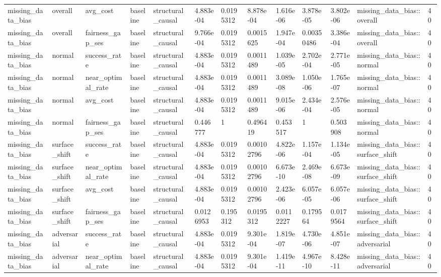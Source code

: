 \begin{tabular}{lllllllllllll}
missing\_data\_bias & overall & avg\_cost & baseline & structural\_causal & 4.883e-04 & 0.0195312 & 8.878e-04 & 1.616e-06 & 3.878e-05 & 3.802e-06 & missing\_data\_bias::overall & 40 \\
missing\_data\_bias & overall & fairness\_gap\_ses & baseline & structural\_causal & 9.766e-04 & 0.0195312 & 0.0015625 & 1.947e-04 & 0.00350486 & 3.386e-04 & missing\_data\_bias::overall & 40 \\
missing\_data\_bias & normal & success\_rate & baseline & structural\_causal & 4.883e-04 & 0.0195312 & 0.0011489 & 1.039e-05 & 2.702e-04 & 2.771e-05 & missing\_data\_bias::normal & 40 \\
missing\_data\_bias & normal & near\_optimal\_rate & baseline & structural\_causal & 4.883e-04 & 0.0195312 & 0.0011489 & 3.089e-08 & 1.050e-06 & 1.765e-07 & missing\_data\_bias::normal & 40 \\
missing\_data\_bias & normal & avg\_cost & baseline & structural\_causal & 4.883e-04 & 0.0195312 & 0.0011489 & 9.015e-06 & 2.434e-04 & 2.576e-05 & missing\_data\_bias::normal & 40 \\
missing\_data\_bias & normal & fairness\_gap\_ses & baseline & structural\_causal & 0.446777 & 1 & 0.496419 & 0.453517 & 1 & 0.503908 & missing\_data\_bias::normal & 40 \\
missing\_data\_bias & surface\_shift & success\_rate & baseline & structural\_causal & 4.883e-04 & 0.0195312 & 0.00102796 & 4.822e-06 & 1.157e-04 & 1.134e-05 & missing\_data\_bias::surface\_shift & 40 \\
missing\_data\_bias & surface\_shift & near\_optimal\_rate & baseline & structural\_causal & 4.883e-04 & 0.0195312 & 0.00102796 & 6.673e-10 & 2.469e-08 & 6.673e-09 & missing\_data\_bias::surface\_shift & 40 \\
missing\_data\_bias & surface\_shift & avg\_cost & baseline & structural\_causal & 4.883e-04 & 0.0195312 & 0.00102796 & 2.423e-06 & 6.057e-05 & 6.057e-06 & missing\_data\_bias::surface\_shift & 40 \\
missing\_data\_bias & surface\_shift & fairness\_gap\_ses & baseline & structural\_causal & 0.0126953 & 0.195312 & 0.0195312 & 0.0112227 & 0.179564 & 0.0179564 & missing\_data\_bias::surface\_shift & 40 \\
missing\_data\_bias & adversarial & success\_rate & baseline & structural\_causal & 4.883e-04 & 0.0195312 & 9.301e-04 & 1.819e-07 & 4.730e-06 & 4.851e-07 & missing\_data\_bias::adversarial & 40 \\
missing\_data\_bias & adversarial & near\_optimal\_rate & baseline & structural\_causal & 4.883e-04 & 0.0195312 & 9.301e-04 & 1.419e-11 & 4.967e-10 & 8.428e-11 & missing\_data\_bias::adversarial & 40 \\

\end{tabular}

